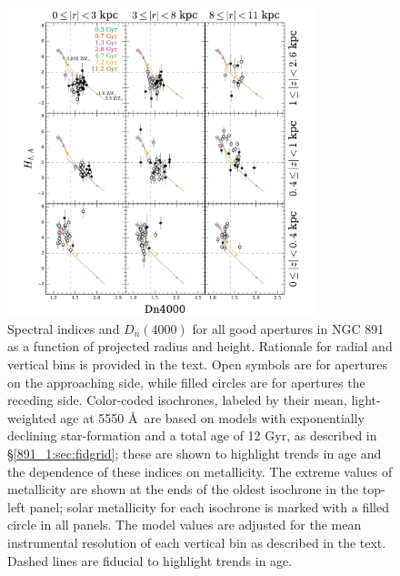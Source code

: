 \begin{figure}[t]
  \centering
  \includegraphics[width=0.8\textwidth]{891_1/figs/Dn4000_multires.pdf}
  \caption[$D_n(4000)$ vs \Hda in radius and height
  bins]{\label{fig:D4000_cuts}\fixspacing Spectral indices \Hda and
    $D_n(4000)$ for all good apertures in NGC 891 as a function of
    projected radius and height. Rationale for radial and vertical
    bins is provided in the text. Open symbols are for apertures on
    the approaching side, while filled circles are for apertures the
    receding side. Color-coded isochrones, labeled by their mean,
    light-weighted age at 5550 \AA\ are based on models with
    exponentially declining star-formation and a total age of 12 Gyr,
    as described in \S\ref{891_1:sec:fidgrid}; these are shown to
    highlight trends in age and the dependence of these indices on
    metallicity. The extreme values of metallicity are shown at the
    ends of the oldest isochrone in the top-left panel; solar
    metallicity for each isochrone is marked with a filled circle in
    all panels. The model values are adjusted for the mean
    instrumental resolution of each vertical bin as described in the
    text. Dashed lines are fiducial to highlight trends in age.}
\end{figure}

